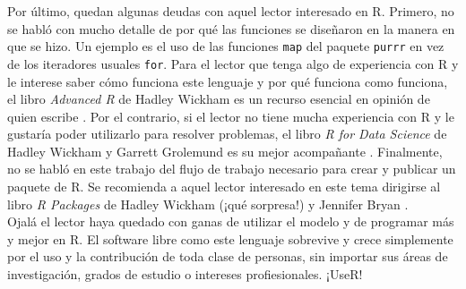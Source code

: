 \documentclass[11pt,a4paper]{article}
\begin{document}
Por último, quedan algunas deudas con aquel lector interesado en R. Primero, no se habló con mucho detalle de por qué las funciones se diseñaron en la manera en que se hizo. Un ejemplo es el uso de las funciones \texttt{map} del paquete \texttt{purrr} \citep{purrr} en vez de los iteradores usuales \texttt{for}. Para el lector que tenga algo de experiencia con R y le interese saber cómo funciona este lenguaje y por qué funciona como funciona, el libro \textit{Advanced R} de Hadley Wickham es un recurso esencial en opinión de quien escribe \citep{advanced_r}. Por el contrario, si el lector no tiene mucha experiencia con R y le gustaría poder utilizarlo para resolver problemas, el libro \textit{R for Data Science} de Hadley Wickham y Garrett Grolemund es su mejor acompañante \citep{rfordatascience}. Finalmente, no se habló en este trabajo del flujo de trabajo necesario para crear y publicar un paquete de R. Se recomienda a aquel lector interesado en este tema dirigirse al libro \textit{R Packages} de Hadley Wickham (¡qué sorpresa!) y Jennifer Bryan \citep{rpackages}.\\

Ojalá el lector haya quedado con ganas de utilizar el modelo y de programar más y mejor en R. El software libre como este lenguaje sobrevive y crece simplemente por el uso y la contribución de toda clase de personas, sin importar sus áreas de investigación, grados de estudio o intereses profiesionales. ¡UseR!

\newpage
\end{document}
